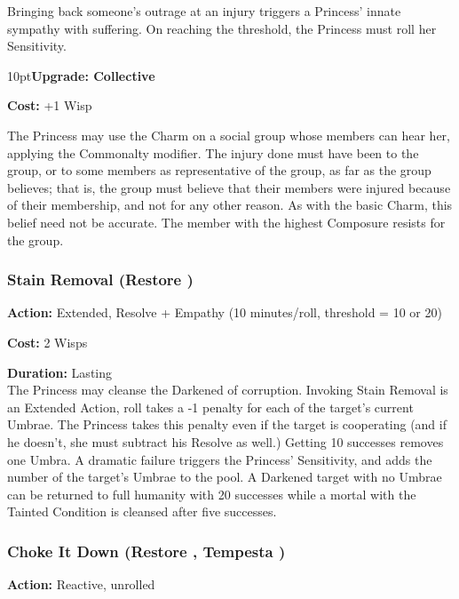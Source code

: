 Bringing back someone's outrage at an injury triggers a Princess' innate sympathy with suffering. On reaching the threshold, the Princess must roll her Sensitivity.
\begin{myindentpar}{10pt}\textbf{Upgrade: Collective}

\noindent \textbf{Cost:} +1 Wisp

The Princess may use the Charm on a social group whose members can hear her, applying the Commonalty modifier. The injury done must have been to the group, or to some members as representative of the group, as far as the group believes; that is, the group must believe that their members were injured because of their membership, and not for any other reason. As with the basic Charm, this belief need not be accurate. The member with the highest Composure resists for the group.\end{myindentpar}


\subsubsection*{Stain Removal (Restore \textbullet\textbullet\textbullet)}

\noindent \textbf{Action:} Extended, Resolve + Empathy (10 minutes/roll, threshold = 10 or 20)

\noindent \textbf{Cost:} 2 Wisps

\noindent \textbf{Duration:} Lasting \\

\noindent The Princess may cleanse the Darkened of corruption. Invoking Stain Removal is an Extended Action, roll takes a -1 penalty for each of the target's current Umbrae. The Princess takes this penalty even if the target is cooperating (and if he doesn't, she must subtract his Resolve as well.) Getting 10 successes removes one Umbra. A dramatic failure triggers the Princess' Sensitivity, and adds the number of the target's Umbrae to the pool. A Darkened target with no Umbrae can be returned to full humanity with 20 successes while a mortal with the Tainted Condition is cleansed after five successes.

\subsubsection*{Choke It Down (Restore \textbullet\textbullet\textbullet, Tempesta \textbullet\textbullet)}

\noindent \textbf{Action:} Reactive, unrolled


